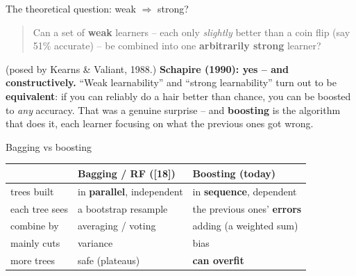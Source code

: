 \documentclass[aspectratio=169]{beamer}
\begin{document}
\begin{frame}{The theoretical question: weak $\Rightarrow$ strong?}
  \begin{quote}
    Can a set of \textbf{weak} learners -- each only \emph{slightly} better than a coin flip
    (say 51\% accurate) -- be combined into one \textbf{arbitrarily strong} learner?
  \end{quote}
  \hfill {\footnotesize (posed by Kearns \& Valiant, 1988.)}
  \vfill
  \textbf{Schapire (1990): yes -- and constructively.} ``Weak learnability'' and ``strong
  learnability'' turn out to be \textbf{equivalent}: if you can reliably do a hair better than
  chance, you can be boosted to \emph{any} accuracy. That was a genuine surprise -- and
  \textbf{boosting} is the algorithm that does it, each learner focusing on what the previous
  ones got wrong.
  \vfill
\end{frame}

\begin{frame}{Bagging vs boosting}
  \begin{center}\small
    \renewcommand{\arraystretch}{1.3}
    \begin{tabular}{l l l}
      & \textbf{Bagging / RF ([18])} & \textbf{Boosting (today)} \\
      \hline
      trees built & in \textbf{parallel}, independent & in \textbf{sequence}, dependent \\
      each tree sees & a bootstrap resample & the previous ones' \textbf{errors} \\
      combine by & averaging / voting & adding (a weighted sum) \\
      mainly cuts & \textcolor{armblue}{variance} & \textcolor{armred}{bias} \\
      more trees & safe (plateaus) & \textbf{can overfit} \\
      \hline
    \end{tabular}
  \end{center}
  \vfill
\end{frame}
\end{document}

